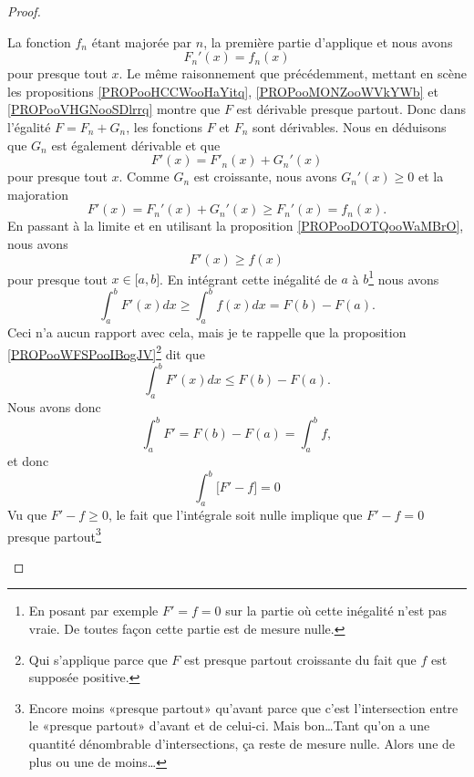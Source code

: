 \begin{proof}
\begin{subproof}
		La fonction \( f_n\) étant majorée par \( n\), la première partie d'applique et nous avons
		\begin{equation}
			F_n'(x)=f_n(x)
		\end{equation}
		pour presque tout \( x\). Le même raisonnement que précédemment, mettant en scène les propositions \ref{PROPooHCCWooHaYitq}, \ref{PROPooMONZooWVkYWb} et \ref{PROPooVHGNooSDlrrq} montre que \( F\) est dérivable presque partout. Donc dans l'égalité \( F=F_n+G_n\), les fonctions \( F\) et \( F_n\) sont dérivables. Nous en déduisons que \( G_n\) est également dérivable et que
		\begin{equation}
			F'(x)=F'_n(x)+G_n'(x)
		\end{equation}
		pour presque tout \( x\). Comme \( G_n\) est croissante, nous avons \( G_n'(x)\geq 0\) et la majoration
		\begin{equation}
			F'(x)=F_n'(x)+G_n'(x)\geq F_n'(x)=f_n(x).
		\end{equation}
		En passant à la limite et en utilisant la proposition \ref{PROPooDOTQooWaMBrO}, nous avons
		\begin{equation}
			F'(x)\geq f(x)
		\end{equation}
		pour presque tout \( x\in \mathopen[ a,b\mathclose]\). En intégrant cette inégalité de \( a\) à \( b\)\footnote{En posant par exemple \( F'=f=0\) sur la partie où cette inégalité n'est pas vraie. De toutes façon cette partie est de mesure nulle.} nous avons
		\begin{equation}
			\int_a^bF'(x)dx\geq \int_a^bf(x)dx=F(b)-F(a).
		\end{equation}
		Ceci n'a aucun rapport avec cela, mais je te rappelle que la proposition \ref{PROPooWFSPooIBogJV}\footnote{Qui s'applique parce que \( F\) est presque partout croissante du fait que \( f\) est supposée positive.} dit que
		\begin{equation}
			\int_a^bF'(x)dx\leq F(b)-F(a).
		\end{equation}
		Nous avons donc
		\begin{equation}
			\int_a^bF'=F(b)-F(a)=\int_a^bf,
		\end{equation}
		et donc
		\begin{equation}
			\int_a^b\big[  F'-f  \big]=0
		\end{equation}
		Vu que \( F'-f\geq 0\), le fait que l'intégrale soit nulle implique que \( F'-f=0\) presque partout\footnote{Encore moins «presque partout» qu'avant parce que c'est l'intersection entre le «presque partout» d'avant et de celui-ci. Mais bon\ldots Tant qu'on a une quantité dénombrable d'intersections, ça reste de mesure nulle. Alors une de plus ou une de moins\ldots}


\end{subproof}
\end{proof}
